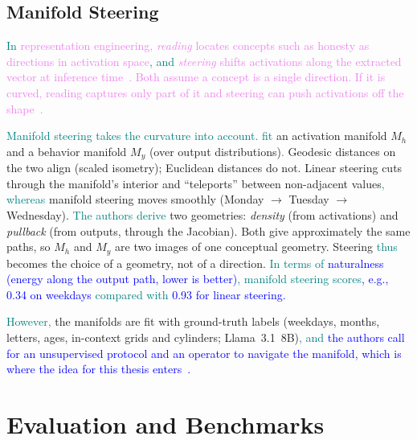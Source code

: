 \documentclass[11pt,a4paper]{article}
\newcommand{\fromextra}[1]{\textcolor{blue}{#1}}
\newcommand{\fromnotes}[1]{\textcolor{green!50!black}{#1}}
\newcommand{\fromold}[1]{\textcolor{violet}{#1}}
\newcommand{\fromprose}[1]{\textcolor{teal}{#1}}
\newcommand{\fromextra}[1]{#1}
\newcommand{\fromnotes}[1]{#1}
\newcommand{\fromold}[1]{#1}
\newcommand{\fromprose}[1]{#1}
\begin{document}
\subsection{Manifold Steering}\label{sec:steering}
\fromold{\fromprose{In} representation engineering, \emph{reading} locates concepts such as honesty as directions in activation space\fromprose{, and} \emph{steering} shifts activations along the extracted vector at inference time~\cite{zou2023representation}.}
\fromold{Both assume a concept is a single direction. If it is curved, reading captures only part of it and steering can push activations off the shape~\cite{wurgaft2026manifoldsteering}.}

\fromprose{Manifold steering takes the curvature into account.} \fromprose{\textcite{wurgaft2026manifoldsteering} fit} an activation manifold $M_h$ and a behavior manifold $M_y$ (over output distributions)\fromprose{.} Geodesic distances on the two align (scaled isometry); Euclidean distances do not.
Linear steering cuts through the manifold's interior and \enquote{teleports} between non-adjacent values\fromprose{, whereas} manifold steering moves smoothly (Monday $\to$ Tuesday $\to$ Wednesday).
\fromprose{The authors derive} two geometries: \emph{density} (from activations) and \emph{pullback} (from outputs, through the Jacobian). Both give approximately the same paths, so $M_h$ and $M_y$ are two images of one conceptual geometry.
Steering \fromprose{thus} becomes the choice of a geometry, not of a direction.
\fromextra{\fromprose{In terms of} naturalness (energy along the output path, lower is better)\fromprose{, manifold steering scores}, e.g., 0.34 on weekdays \fromprose{compared with} 0.93 for linear steering.}

\fromnotes{\fromprose{However,} the manifolds are fit with ground-truth labels (weekdays, months, letters, ages, in-context grids and cylinders; Llama~3.1~8B)}\fromprose{, and} \fromextra{the authors call for an unsupervised protocol and an operator to navigate the manifold, which is where the idea for this thesis enters~\cite{wurgaft2026manifoldsteering}.}

\section{Evaluation and Benchmarks}
\end{document}
